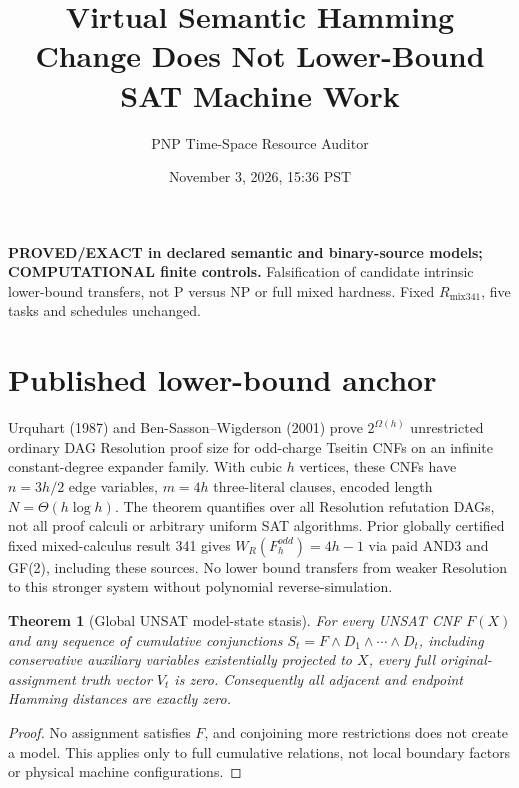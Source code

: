 \documentclass[11pt]{article}
\title{Virtual Semantic Hamming Change Does Not Lower-Bound SAT Machine Work}
\author{PNP Time-Space Resource Auditor}
\date{November 3, 2026, 15:36 PST}
\newtheorem{theorem}{Theorem}
\begin{document}
\maketitle
\noindent\textbf{PROVED/EXACT in declared semantic and binary-source models; COMPUTATIONAL finite controls.} Falsification of candidate intrinsic lower-bound transfers, not P versus NP or full mixed hardness. Fixed $R_{\mathrm{mix341}}$, five tasks and schedules unchanged.

\section*{Published lower-bound anchor}
Urquhart (1987) and Ben-Sasson--Wigderson (2001) prove $2^{\Omega(h)}$ unrestricted ordinary DAG Resolution proof size for odd-charge Tseitin CNFs on an infinite constant-degree expander family. With cubic $h$ vertices, these CNFs have $n=3h/2$ edge variables, $m=4h$ three-literal clauses, encoded length $N=\Theta(h\log h)$. The theorem quantifies over all Resolution refutation DAGs, not all proof calculi or arbitrary uniform SAT algorithms. Prior globally certified fixed mixed-calculus result 341 gives $W_R(F_h^{odd})=4h-1$ via paid AND3 and GF(2), including these sources. No lower bound transfers from weaker Resolution to this stronger system without polynomial reverse-simulation.

\begin{theorem}[Global UNSAT model-state stasis]
For every UNSAT CNF $F(X)$ and any sequence of cumulative conjunctions $S_t=F\wedge D_1\wedge\cdots\wedge D_t$, including conservative auxiliary variables existentially projected to $X$, every full original-assignment truth vector $V_t$ is zero. Consequently all adjacent and endpoint Hamming distances are exactly zero.
\end{theorem}
\begin{proof}No assignment satisfies $F$, and conjoining more restrictions does not create a model. This applies only to full cumulative relations, not local boundary factors or physical machine configurations.\end{proof}
\end{document}
